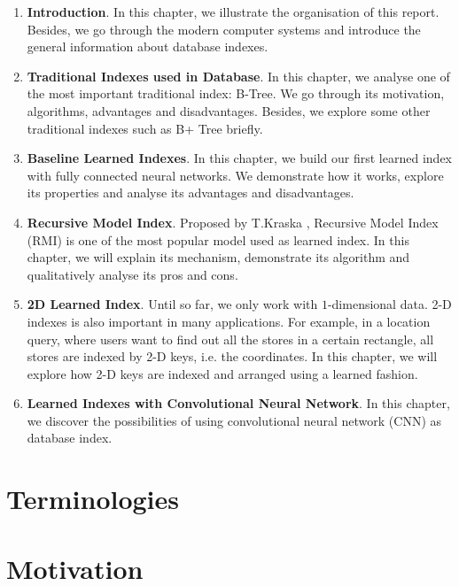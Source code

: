 \begin{enumerate}
	\item \textbf{Introduction}. In this chapter, we illustrate the organisation of this report. Besides, we go through the modern computer systems and introduce the general information about database indexes. 
	\item \textbf{Traditional Indexes used in Database}. In this chapter, we analyse one of the most important traditional index: B-Tree. We go through its motivation, algorithms, advantages and disadvantages. Besides, we explore some other traditional indexes such as B+ Tree briefly.
	\item \textbf{Baseline Learned Indexes}. In this chapter, we build our first learned index with fully connected neural networks. We demonstrate how it works, explore its properties and analyse its advantages and disadvantages. 
	\item \textbf{Recursive Model Index}. Proposed by T.Kraska \cite{kraska2018case},  Recursive Model Index (RMI) is one of the most popular model used as learned index. In this chapter, we will explain its mechanism, demonstrate its algorithm and qualitatively analyse its pros and cons. 
	\item \textbf{2D Learned Index}. Until so far, we only work with $1$-dimensional data. 2-D indexes is also important in many applications. For example, in a location query, where users want to find out all the stores in a certain rectangle, all stores are indexed by 2-D keys, i.e. the coordinates. In this chapter, we will explore how 2-D keys are indexed and arranged using a learned fashion.
	\item \textbf{Learned Indexes with Convolutional Neural Network}. In this chapter, we discover the possibilities of using convolutional neural network (CNN) as database index. 
\end{enumerate}

\section{Terminologies}



\section{Motivation}




